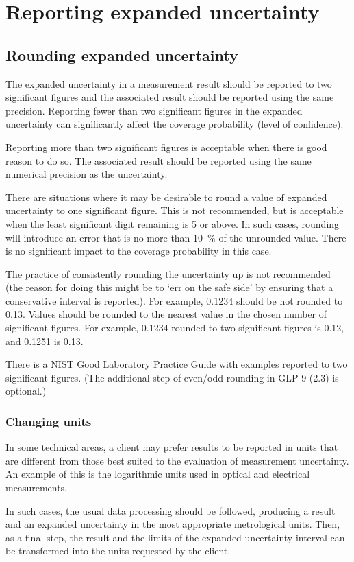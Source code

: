 \section{Reporting expanded uncertainty}
\subsection{Rounding expanded uncertainty}
The expanded uncertainty in a measurement result should be reported to two significant figures and the associated result should be reported using the same precision. Reporting fewer than two significant figures in the expanded uncertainty can significantly affect the coverage probability (level of confidence). 
 
Reporting more than two significant figures is acceptable when there is good reason to do so. The associated result should be reported using the same numerical precision as the uncertainty.

There are situations where it may be desirable to round a value of expanded uncertainty to one significant figure. This is not recommended, but is acceptable when the least significant digit remaining is 5 or above. In such cases, rounding will introduce an error that is no more than \SI{10}{\%} of the unrounded value. There is no significant impact to the coverage probability in this case.

The practice of consistently rounding the uncertainty up is not recommended (the reason for doing this might be to `err on the safe side' by ensuring that a conservative interval is reported). For example, 0.1234 should be not rounded to 0.13. Values should be rounded to the nearest value in the chosen number of significant figures. For example, 0.1234 rounded to two significant figures is 0.12, and 0.1251 is 0.13. 

There is a NIST Good Laboratory Practice Guide \cite{GLP9} with examples reported to two significant figures. (The additional step of even/odd rounding in GLP 9 (2.3) is optional.)

\subsubsection{Changing units}
In some technical areas, a client may prefer results to be reported in units that are different from those best suited to the evaluation of measurement uncertainty. An example of this is the logarithmic units used in optical and electrical measurements. 

In such cases, the usual data processing should be followed, producing a result and an expanded uncertainty in the most appropriate metrological units. Then, as a final step, the result and the limits of the expanded uncertainty interval can be transformed into the units requested by the client. 

